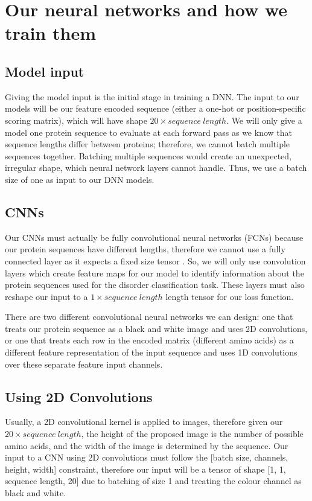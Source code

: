 \documentclass{l4proj}
\begin{document}
\section{Our neural networks and how we train them}

\subsection{Model input}

Giving the model input is the initial stage in training a DNN. The input to our models will be our feature encoded sequence (either a one-hot or position-specific scoring matrix), which will have shape $20\times sequence\ length$. We will only give a model one protein sequence to evaluate at each forward pass as we know that sequence lengths differ between proteins; therefore, we cannot batch multiple sequences together. Batching multiple sequences would create an unexpected, irregular shape, which neural network layers cannot handle. Thus, we use a batch size of one as input to our DNN models.

\subsection{CNNs}
\label{chap:design section:cnn}

Our CNNs must actually be fully convolutional neural networks (FCNs) because our protein sequences have different lengths, therefore we cannot use a fully connected layer as it expects a fixed size tensor \citep{fcn_seg}. So, we will only use convolution layers which create feature maps for our model to identify information about the protein sequences used for the disorder classification task. These layers must also reshape our input to a $1\times sequence\ length$ length tensor for our loss function.

There are two different convolutional neural networks we can design: one that treats our protein sequence as a black and white image and uses 2D convolutions, or one that treats each row in the encoded matrix (different amino acids) as a different feature representation of the input sequence and uses 1D convolutions over these separate feature input channels. 

\subsection*{Using 2D Convolutions}

Usually, a 2D convolutional kernel is applied to images, therefore given our $20\times sequence\ length$, the height of the proposed image is the number of possible amino acids, and the width of the image is determined by the sequence. Our input to a CNN using 2D convolutions must follow the [batch size, channels, height, width] constraint, therefore our input will be a tensor of shape [1, 1, sequence length, 20] due to batching of size 1 and treating the colour channel as black and white. 
\end{document}
